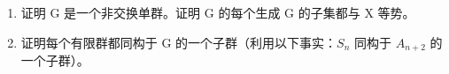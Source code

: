 \begin{enumerate}
\def\labelenumi{(\alph{enumi})}
\item
  证明 G 是一个非交换单群。证明 G 的每个生成 G 的子集都与 X 等势。
\item
  证明每个有限群都同构于 G 的一个子群（利用以下事实：\(S_{n}\) 同构于 \(A_{n+2}\) 的一个子群）。
\end{enumerate}

